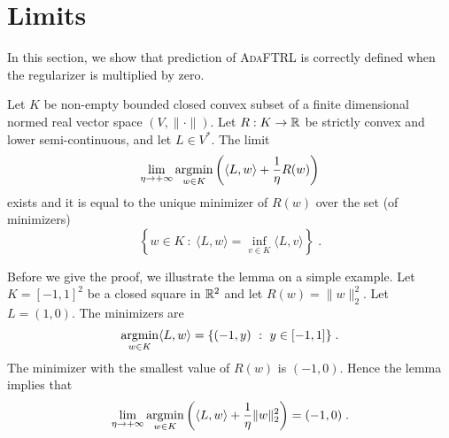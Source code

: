 \section{Limits}
\label{section:limits}

In this section, we show that prediction of \textsc{AdaFTRL} is correctly
defined when the regularizer is multiplied by zero.

\begin{lemma}
\label{lemma:prediction-limit-existence}
Let $K$ be non-empty bounded closed convex subset of a finite dimensional
normed real vector space $(V, \|\cdot\|)$.  Let $R:K \to \mathbb{R}$ be strictly convex
and lower semi-continuous, and let $L \in V^*$. The limit
\begin{equation}
\label{equation:limit}
\lim_{\eta \to +\infty}
\operatorname*{argmin}_{w \in K} \left( \langle L, w \rangle + \frac{1}{\eta} R(w) \right)
\end{equation}
exists and it is equal to the unique minimizer of $R(w)$ over the set (of minimizers)
$$
\left\{ w \in K ~:~ \langle L, w \rangle = \inf_{v \in K} \langle L, v \rangle \right\} \; .
$$
\end{lemma}

Before we give the proof, we illustrate the lemma on a simple
example.  Let $K = [-1,1]^2$ be a closed square in $\mathbb{R}^2$ and let
$R(w) = \|w\|_2^2$. Let $L = (1,0)$. The minimizers are
$$
\operatorname*{argmin}_{w \in K} \langle L, w \rangle = \{ (-1,y) ~:~ y \in [-1,1] \} \; .
$$
The minimizer with the smallest value of $R(w)$ is $(-1,0)$. Hence the lemma
implies that
$$
\lim_{\eta \to +\infty} \operatorname*{argmin}_{w \in K}
\left( \langle L, w \rangle + \frac{1}{\eta} \|w\|_2^2 \right) = (-1, 0) \; .
$$

